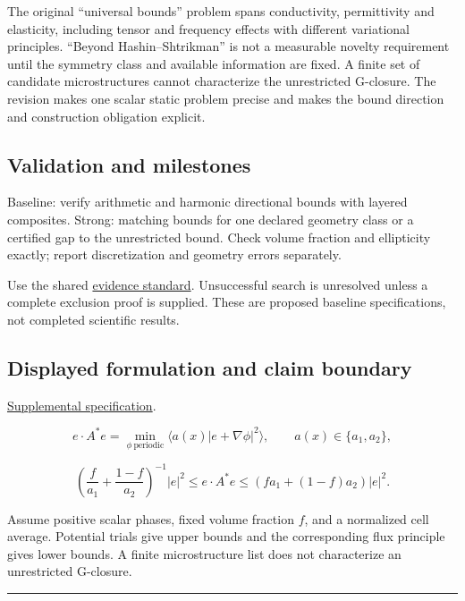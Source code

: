 \documentclass[
  11pt,
]{article}
\begin{document}
The original ``universal bounds'' problem spans conductivity,
permittivity and elasticity, including tensor and frequency effects with
different variational principles. ``Beyond Hashin--Shtrikman'' is not a
measurable novelty requirement until the symmetry class and available
information are fixed. A finite set of candidate microstructures cannot
characterize the unrestricted G-closure. The revision makes one scalar
static problem precise and makes the bound direction and construction
obligation explicit.

\subsection{Validation and milestones}

Baseline: verify arithmetic and harmonic directional bounds with layered
composites. Strong: matching bounds for one declared geometry class or a
certified gap to the unrestricted bound. Check volume fraction and
ellipticity exactly; report discretization and geometry errors
separately.

Use the shared
\href{https://github.com/rick-stevens-ai/Pure-Thought/blob/main/reviews/EVIDENCE-STANDARD.md}{evidence
standard}. Unsuccessful search is unresolved unless a complete exclusion
proof is supplied. These are proposed baseline specifications, not
completed scientific results.

\subsection{Displayed formulation and claim boundary}

\href{https://github.com/rick-stevens-ai/Pure-Thought/blob/main/supplemental/S03.md}{Supplemental
specification}.

\[e\cdot A^*e=\min_{\phi\ \mathrm{periodic}}
\langle a(x)|e+\nabla\phi|^2\rangle,\qquad a(x)\in\{a_1,a_2\},\]

\[\left(\frac f{a_1}+\frac{1-f}{a_2}\right)^{-1}|e|^2
\le e\cdot A^*e\le(fa_1+(1-f)a_2)|e|^2.\]

Assume positive scalar phases, fixed volume fraction \(f\), and a
normalized cell average. Potential trials give upper bounds and the
corresponding flux principle gives lower bounds. A finite microstructure
list does not characterize an unrestricted G-closure.

\begin{center}\rule{0.5\linewidth}{0.5pt}\end{center}
\end{document}
